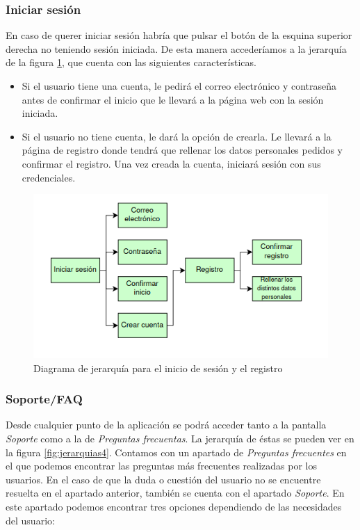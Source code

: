 \subsubsection*{Iniciar sesión}

En caso de querer iniciar sesión habría que pulsar el botón de la esquina superior derecha no teniendo
sesión iniciada. De esta manera accederíamos a la jerarquía de la figura \ref{fig:jerarquias3}, que
cuenta con las siguientes características.

\begin{itemize}
      \item Si el usuario tiene una cuenta, le pedirá el correo electrónico y contraseña antes
            de confirmar el inicio que le llevará a la página web con la sesión iniciada.
      \item Si el usuario no tiene cuenta, le dará la opción de crearla. Le llevará a la página
            de registro donde tendrá que rellenar los datos personales pedidos y confirmar el
            registro. Una vez creada la cuenta, iniciará sesión con sus credenciales.
\end{itemize}

\begin{figure}
      \centering
      \includegraphics[width=0.8\linewidth]{./Imagenes/jerarquia-registro.png}
      \caption{Diagrama de jerarquía para el inicio de sesión y el registro}
      \label{fig:jerarquias3}
\end{figure}

\subsubsection*{Soporte/FAQ}

Desde cualquier punto de la aplicación se podrá acceder tanto a la pantalla \textit{Soporte} como
a la de \textit{Preguntas frecuentas}. La jerarquía de éstas se pueden ver en la figura \ref{fig:jerarquias4}.
Contamos con un apartado de \textit{Preguntas frecuentes} en el que podemos encontrar las preguntas
más frecuentes realizadas por los usuarios. En el caso de que la duda o cuestión del usuario no se
encuentre resuelta en el apartado anterior, también se cuenta con el apartado \textit{Soporte}. En
este apartado podemos encontrar tres opciones dependiendo de las necesidades del usuario:

